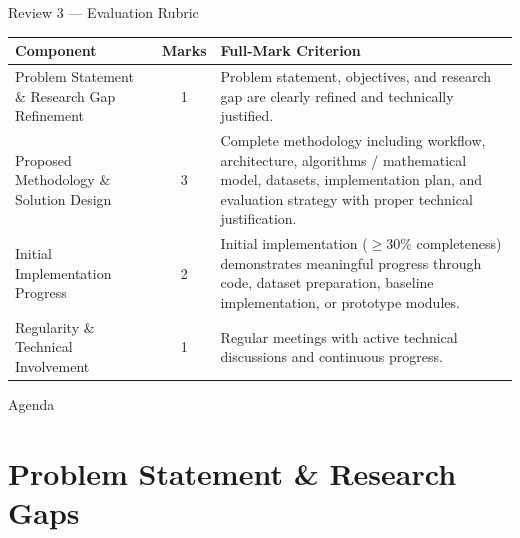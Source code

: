\documentclass[aspectratio=169, 10pt]{beamer}
\begin{document}
\begin{frame}{Review 3 --- Evaluation Rubric}
\small
\renewcommand{\arraystretch}{1.15}
\begin{tabular}{p{3.8cm}cp{7.8cm}}
    \toprule
    \textbf{Component} & \textbf{Marks} & \textbf{Full-Mark Criterion}\\
    \midrule
    Problem Statement \& Research Gap Refinement & 1 &
        Problem statement, objectives, and research gap are clearly refined and technically justified.\\
    Proposed Methodology \& Solution Design & 3 &
        Complete methodology including workflow, architecture, algorithms / mathematical model, datasets, implementation plan, and evaluation strategy with proper technical justification.\\
    Initial Implementation Progress & 2 &
        Initial implementation ($\geq$30\% completeness) demonstrates meaningful progress through code, dataset preparation, baseline implementation, or prototype modules.\\
    Regularity \& Technical Involvement & 1 &
        Regular meetings with active technical discussions and continuous progress.\\
    \bottomrule
\end{tabular}
\end{frame}

\begin{frame}{Agenda}\tableofcontents\end{frame}

\section{Problem Statement \& Research Gaps}
\end{document}
